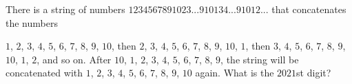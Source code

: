 There is a string of numbers $1234567891023...910134 ...91012...$ that concatenates the numbers

$1$, $2$, $3$, $4$, $5$, $6$, $7$, $8$, $9$, $10$, then $2$, $3$, $4$, $5$, $6$, $7$, $8$, $9$, $10$, $1$, then $3$, $4$, $5$, $6$, $7$, $8$, $9$, $10$, $1$, $2$, and so on. After $10$, $1$, $2$, $3$, $4$, $5$, $6$, $7$, $8$, $9$, the string will be concatenated with $1$, $2$, $3$, $4$, $5$, $6$, $7$, $8$, $9$, $10$ again. What is the $2021$st digit?
